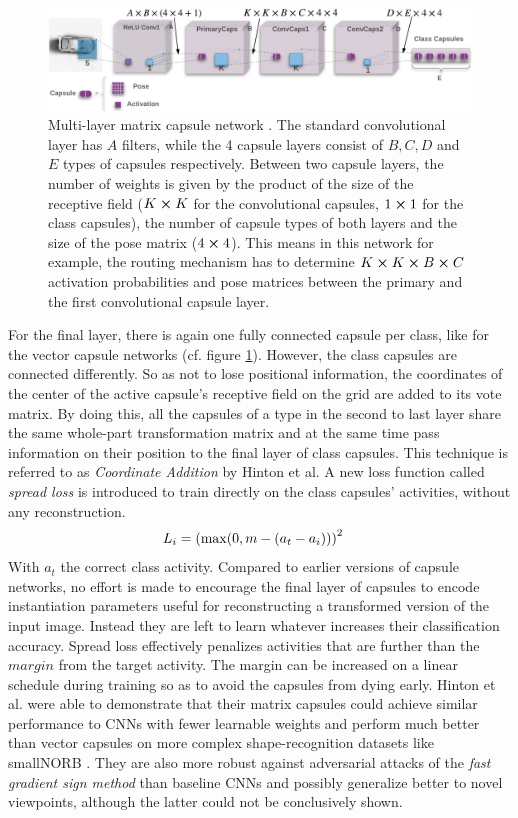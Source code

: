 \begin{figure}[H]
    \centering
    \includegraphics[width=\textwidth]{figures/matrix-capsules.png}
\caption[Multi-layer matrix capsule network]{Multi-layer matrix capsule network \cite{hinton2018matrix}. The standard convolutional layer has $A$ filters, while the 4 capsule layers consist of $B,C,D$ and $E$ types of capsules respectively. Between two capsule layers, the number of weights is given by the product of the size of the receptive field ($K\cross K$ for the convolutional capsules, $1\cross 1$ for the class capsules), the number of capsule types of both layers and the size of the pose matrix ($4\cross 4$). This means in this network for example, the routing mechanism has to determine $K\cross K\cross B\cross C$ activation probabilities and pose matrices between the primary and the first convolutional capsule layer.}\label{fig:matrix-capsules}
\end{figure}\noindent
For the final layer, there is again one fully connected capsule per class, like for the vector capsule networks (cf. figure \ref{fig:matrix-capsules}). However, the class capsules are connected differently. So as not to lose positional information, the coordinates of the center of the active capsule's receptive field on the grid are added to its vote matrix. By doing this, all the capsules of a type in the second to last layer share the same whole-part transformation matrix and at the same time pass information on their position to the final layer of class capsules. This technique is referred to as \emph{Coordinate Addition} by Hinton et al.
A new loss function called \emph{spread loss} is introduced to train directly on the class capsules' activities, without any reconstruction.
\begin{align}
    L_i &= \qty(\max(0,m-\qty(a_t-a_i)))^2
\end{align}
With $a_t$ the correct class activity. Compared to earlier versions of capsule networks, no effort is made to encourage the final layer of capsules to encode instantiation parameters useful for reconstructing a transformed version of the input image. Instead they are left to learn whatever increases their classification accuracy. Spread loss effectively penalizes activities that are further than the $margin$ from the target activity. The margin can be increased on a linear schedule during training so as to avoid the capsules from dying early. Hinton et al. were able to demonstrate that their matrix capsules could achieve similar performance to CNNs with fewer learnable weights and perform much better than vector capsules on more complex shape-recognition datasets like smallNORB \cite{lecun2004learning}. They are also more robust against adversarial attacks of the \emph{fast gradient sign method} than baseline CNNs and possibly generalize better to novel viewpoints, although the latter could not be conclusively shown.